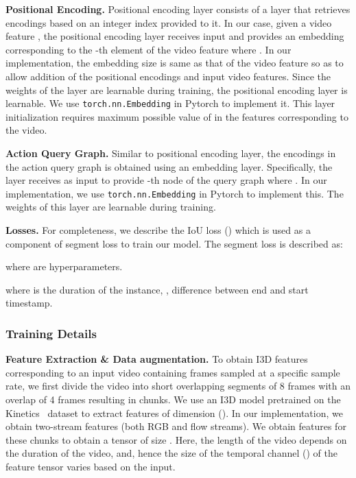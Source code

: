 \documentclass[10pt,twocolumn,letterpaper]{article}
\begin{document}
\vspace{0.05in}
\noindent
\textbf{Positional Encoding. }Positional encoding layer consists of a layer that retrieves encodings based on an integer index provided to it. In our case, given a video feature , the positional encoding layer receives input  and provides an embedding  corresponding to the -th element of the video feature  where . In our implementation, the embedding size is same as that of the video feature so as to allow addition of the positional encodings and input video features. Since the weights of the layer are learnable during training, the positional encoding layer is learnable. We use \texttt{torch.nn.Embedding} in Pytorch to implement it. This layer initialization requires maximum possible value of  in the features corresponding to the video.

\vspace{0.05in}
\noindent
\textbf{Action Query Graph. }Similar to positional encoding layer, the  encodings in the action query graph  is obtained using an embedding layer. Specifically, the layer receives  as input to provide -th node  of the query graph where . In our implementation, we use \texttt{torch.nn.Embedding} in Pytorch to implement this. The weights of this layer are learnable during training.


\vspace{0.05in}
\noindent
\textbf{Losses. }For completeness, we describe the IoU loss () which is used as a component of segment loss  to train our model. The segment loss is described as:

where  are hyperparameters.


 where  is the duration of the instance, \ie, difference between end and start timestamp.


\subsubsection{Training Details}
\label{subsec:imp_tech}
\textbf{Feature Extraction \& Data augmentation.} To obtain I3D features corresponding to an input video  containing  frames sampled at a specific sample rate, we first divide the video into short overlapping segments of 8 frames with an overlap of 4 frames resulting in  chunks. We use an I3D model pretrained on the Kinetics~\cite{carreira2017quo} dataset to extract features of dimension  (). In our implementation, we obtain two-stream features (both RGB and flow streams). We obtain features for these  chunks to obtain a tensor of size . Here, the length of the video  depends on the duration of the video, and, hence the size of the temporal channel (\ie ) of the feature tensor varies based on the input.
\end{document}
